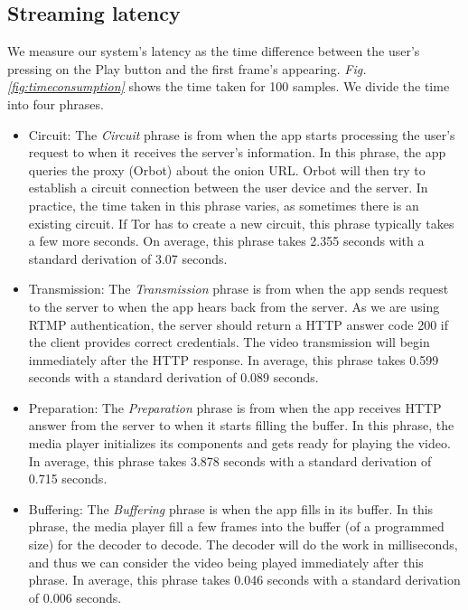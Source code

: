 \subsection{Streaming latency}
\label{subsec:streaming_latency}
We measure our system's latency as the time difference between the user’s pressing on the Play button and the first frame’s appearing. \textit{Fig. \ref{fig:timeconsumption}} shows the time taken for 100 samples. We divide the time into four phrases.
\begin{itemize}
	\item Circuit: The \textit{Circuit} phrase is from when the app starts processing the user’s request to when it receives the server's information. In this phrase, the app queries the proxy (Orbot) about the onion URL. Orbot will then try to establish a circuit connection between the user device and the server. In practice, the time taken in this phrase varies, as sometimes there is an existing circuit. If Tor has to create a new circuit, this phrase typically takes a few more seconds. On average, this phrase takes 2.355 seconds with a standard derivation of 3.07 seconds.
	\item Transmission: The \textit{Transmission} phrase is from when the app sends request to the server to when the app hears back from the server. As we are using RTMP authentication, the server should return a HTTP answer code 200 if the client provides correct credentials. The video transmission will begin immediately after the HTTP response. In average, this phrase takes 0.599 seconds with a standard derivation of 0.089 seconds.
	\item Preparation: The \textit{Preparation} phrase is from when the app receives HTTP answer from the server to when it starts filling the buffer. In this phrase, the media player initializes its components and gets ready for playing the video. In average, this phrase takes 3.878 seconds with a standard derivation of 0.715 seconds.
	\item Buffering: The \textit{Buffering} phrase is when the app fills in its buffer. In this phrase, the media player fill a few frames into the buffer (of a programmed size) for the decoder to decode. The decoder will do the work in milliseconds, and thus we can consider the video being played immediately after this phrase. In average, this phrase takes 0.046 seconds with a standard derivation of 0.006 seconds.
\end{itemize}

